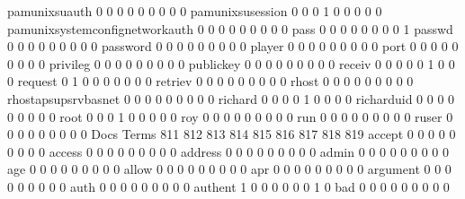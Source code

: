 \documentclass[compress,8pt]{beamer}
\begin{document}
\begin{frame}
\begin{Schunk}
  pamunixsuauth                              0   0   0   0   0   0   0   0   0
  pamunixsusession                           0   0   0   1   0   0   0   0   0
  pamunixsystemconfignetworkauth             0   0   0   0   0   0   0   0   0
  pass                                       0   0   0   0   0   0   0   0   1
  passwd                                     0   0   0   0   0   0   0   0   0
  password                                   0   0   0   0   0   0   0   0   0
  player                                     0   0   0   0   0   0   0   0   0
  port                                       0   0   0   0   0   0   0   0   0
  privileg                                   0   0   0   0   0   0   0   0   0
  publickey                                  0   0   0   0   0   0   0   0   0
  receiv                                     0   0   0   0   0   1   0   0   0
  request                                    0   1   0   0   0   0   0   0   0
  retriev                                    0   0   0   0   0   0   0   0   0
  rhost                                      0   0   0   0   0   0   0   0   0
  rhostapsupsrvbasnet                        0   0   0   0   0   0   0   0   0
  richard                                    0   0   0   0   1   0   0   0   0
  richarduid                                 0   0   0   0   0   0   0   0   0
  root                                       0   0   0   1   0   0   0   0   0
  roy                                        0   0   0   0   0   0   0   0   0
  run                                        0   0   0   0   0   0   0   0   0
  ruser                                      0   0   0   0   0   0   0   0   0
                                          Docs
Terms                                      811 812 813 814 815 816 817 818 819
  accept                                     0   0   0   0   0   0   0   0   0
  access                                     0   0   0   0   0   0   0   0   0
  address                                    0   0   0   0   0   0   0   0   0
  admin                                      0   0   0   0   0   0   0   0   0
  age                                        0   0   0   0   0   0   0   0   0
  allow                                      0   0   0   0   0   0   0   0   0
  apr                                        0   0   0   0   0   0   0   0   0
  argument                                   0   0   0   0   0   0   0   0   0
  auth                                       0   0   0   0   0   0   0   0   0
  authent                                    1   0   0   0   0   0   0   1   0
  bad                                        0   0   0   0   0   0   0   0   0

\end{Schunk}
\end{frame}
\end{document}
